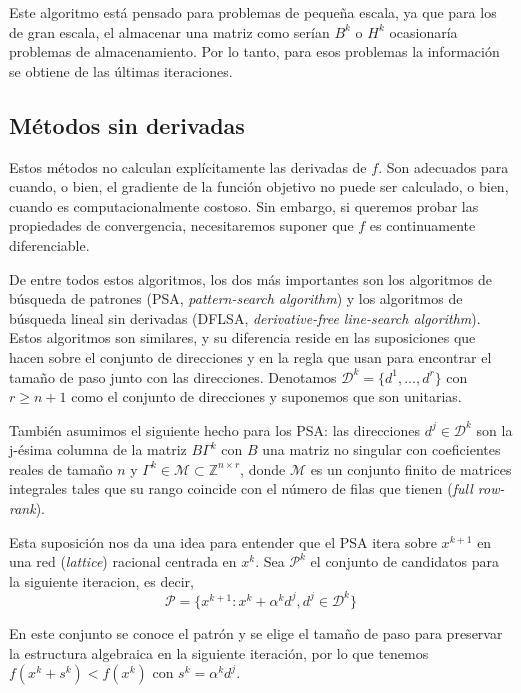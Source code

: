 Este algoritmo está pensado para problemas de pequeña escala, ya que para los de gran escala, el almacenar una matriz como serían $B^k$ o $H^k$ ocasionaría problemas de almacenamiento. 
Por lo tanto, para esos problemas la información se obtiene de las últimas iteraciones. 

\subsection{Métodos sin derivadas}

Estos métodos no calculan explícitamente las derivadas de $f$. 
Son adecuados para cuando, o bien, el gradiente de la función objetivo no puede ser calculado, o bien, cuando es computacionalmente costoso. 
Sin embargo, si queremos probar las propiedades de convergencia, necesitaremos suponer que $f$ es continuamente diferenciable. 

De entre todos estos algoritmos, los dos más importantes son los algoritmos de búsqueda de patrones (PSA, \textit{pattern-search algorithm}) y los algoritmos de búsqueda lineal sin derivadas (DFLSA, \textit{derivative-free line-search algorithm}). 
Estos algoritmos son similares, y su diferencia reside en las suposiciones que hacen sobre el conjunto de direcciones y en la regla que usan para encontrar el tamaño de paso junto con las direcciones. 
Denotamos $\mathcal{D}^k = \{d^1,...,d^r\}$ con $r\geq n+1$ como el conjunto de direcciones y suponemos que son unitarias. 

También asumimos el siguiente hecho para los PSA: las direcciones $d^j\in\mathcal{D}^k$ son la j-ésima columna de la matriz $B\Gamma^k$ con $B$ una matriz no singular con coeficientes reales de tamaño $n$ y $\Gamma^k\in\mathcal{M}\subset \mathbb{Z}^{n\times r}$, donde $\mathcal{M}$ es un conjunto finito	de matrices integrales tales que su rango coincide con el número de filas que tienen (\textit{full row-rank}).

Esta suposición nos da una idea para entender que el PSA itera sobre $x^{k+1}$ en una red (\textit{lattice}) racional centrada en $x^k$. 
Sea $\mathcal{P}^k$ el conjunto de candidatos para la siguiente iteracion, es decir, 
\begin{equation*}
\mathcal{P} = \{x^{k+1} : x^k + \alpha^kd^j, d^j\in\mathcal{D}^k\}
\end{equation*}

En este conjunto se conoce el patrón y se elige el tamaño de paso para preservar la estructura algebraica en la siguiente iteración, por lo que tenemos $f(x^k+s^k) < f(x^k)$ con $s^k = \alpha^k d^j$.

